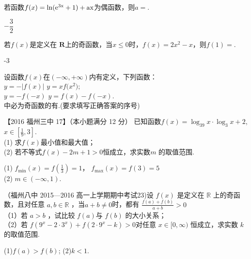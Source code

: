 \begin{exercise}
      若函数$f(x)=\ln (\rm e^{3x}+1)+ax$为偶函数，则$ a= $\tk.
      \begin{answer}
        $-\dfrac{3}2$
      \end{answer}
    \item
      若$f(x)$是定义在 $\mathbf{R} $上的奇函数，当$ x\le0 $时，$f(x)=2x^2-x$，则$f(1)=$\tk.
      \begin{answer}
        -3
      \end{answer}
    \item
      设函数$f(x)$在$ \left(-\infty,+\infty\right) $内有定义，下列函数：\\
       $ y=-\left|f(x)\right| $\qquad{} $ y=xf\bigl(x^2\bigr) $;\\
       $ y=-f(-x) $\qquad {} $ y=f(x)-f(-x) $.\\
      中必为奇函数的有\tk.(要求填写正确答案的序号)
      \begin{answer}
      \end{answer}
    \item
      【2016 福州三中 17】（本小题满分 12 分）
      已知函数$f(x)=\log_39x\cdot\log_3x+2 $,$x\in[\frac19,3]$.\\
      (1) 求$f(x)$最小值和最大值；\\
      (2) 若不等式$f(x)-2m+1>0 $恒成立，求实数$m$ 的取值范围.
      \begin{answer}
        (1) $f_{\min}(x)=f(\frac13)=1$，
              $f_{\max}(x)=f(3)=5$\\
        (2) $m\in(-\infty,1)$.
      \end{answer}
    \vspace{22em}
    \item
      （福州八中 2015—2016 高一上学期期中考试23)设 $f (x )$ 是定义在 $\mathbb{R}$ 上的奇函数，且对任意 $a,b\in \mathbb{R}$ ，当$a+b\neq0$时，都有 $\frac{f(a)+f(b)}{a+b}>0$\\
      （1）若 $a> b$ ，试比较 $f (a ) $与 $f (b)$ 的大小关系；\\
      （2）若 $f (9^x- 2\cdot 3^x )+ f ( 2\cdot 9^x-k )> 0 $对任意 $x\in[0,\infty )$ 恒成立，求实数 $k$ 的取值范围.
      \begin{answer}
      (1)$f(a)>f(b)$;
      (2)$k<1$.
      \end{answer}
    \vspace{22em}
    \item

\end{exercise}
